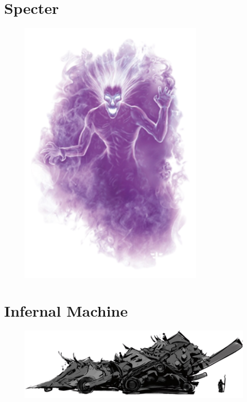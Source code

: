 \documentclass[oneside]{clgrammar}
\begin{document}
\section{Specter}
\begin{figure}[h!]
\centering
\includegraphics[width=250pt]{images/monstros/spcter-removebg-preview.png}
\end{figure}

\newpage

\section{Infernal Machine}
\begin{figure}[h!]
\centering
\includegraphics[width=450pt]{images/monstros/infernal-machine-removebg-preview.png}
\end{figure}

\newpage
\end{document}
